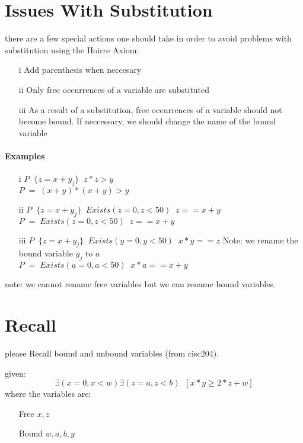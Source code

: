 \documentclass[12pt]{book}
\begin{document}
\section*{Issues With Substitution}
there are a few special actions one should take in order to avoid problems with substitution using the Hoirre Axiom:
\begin{itemize}
        \item[i] Add parenthesis when neccesary
        \item[ii] Only free occurrences of a variable are substituted
        \item[iii] As a result of a substitution, free occurrences of a variable should not become bound. If neccessary, we should change the name of 
                the bound variable
\end{itemize}
\paragraph{Examples}
\begin{itemize}
        \item[i] $P\;\;\{z = x + y_j\}\;\; z*z > y$\\
                $P\;=\;(x+y)*(x+y) > y$
        \item[ii] $P\;\;\{z = x+y_j\}\;\;Exists(z=0, z<50)\;\;z==x+y$\\
                $P\;=\;Exists(z=0, z<50)\;\; z == x+y$
        \item[iii] $P\;\;\{z = x+y_j\}\;\;Exists(y=0, y < 50)\;\;x*y == z$ Note: we rename the bound variable $y_j$ to $a$\\
                $P\;=\;Exists(a=0, a<50)\;\;x*a == x+y$
\end{itemize}
note: we cannot rename free variables but we can rename bound variables.
\section*{Recall}
please Recall bound and unbound variables (from cisc204). 

given:
\[\exists(x = 0, x<w)\exists(z=a, z<b)\;\;[x*y \geq 2*z + w]\]
where the variables are:
\begin{itemize}
        \item[Free] $x, z$
        \item[Bound] $w, a, b, y$
\end{itemize}
\end{document}
